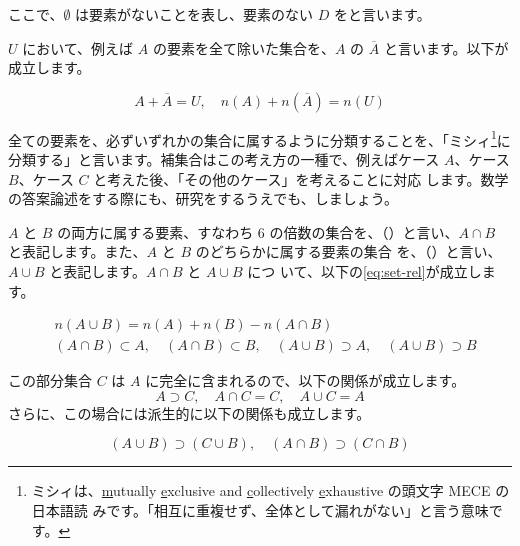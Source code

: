 ここで、$\emptyset$ は要素がないことを表し、要素のない $D$ をと言います。

$U$ において、例えば $A$ の要素を全て除いた集合を、$A$ の $\overline{A}$ と言います。以下が成立します。 

\begin{equation}
    A + \overline{A} = U,\quad n(A) + n(\overline{A}) = n(U) 
\end{equation}


全ての要素を、必ずいずれかの集合に属するように分類することを、「ミシ\nobreak ィ\footnote{ミシィは、\underline{m}utually \underline{e}xclusive and \underline{c}ollectively \underline{e}xhaustive の頭文字 MECE の日本語読 みです。「相互に重複せず、全体として漏れがない」と言う意味です。}に分類する」と言います。補集合はこの考え方の一種で、例えばケース $A$、ケース $B$、ケース $C$ と考えた後、「その他のケース」を考えることに対応 します。数学の答案論述をする際にも、研究をするうえでも、しましょう。 

$A$ と $B$ の両方に属する要素、すなわち 6 の倍数の集合を、（）と言い、$A \cap B$ と表記します。また、$A$ と $B$ のどちらかに属する要素の集合 を、（）と言い、$A \cup B$ と表記します。$A \cap B$ と $A \cup B$ につ いて、以下の\cref{eq:set-rel}が成立します。

\begin{equation}\label{eq:set-rel}
    \begin{split}
        &n(A \cup B) = n(A) + n(B) - n(A \cap B)\\
        &(A \cap B)\subset A,\quad(A \cap B)\subset B,\quad (A \cup B)\supset A,\quad (A \cup B)\supset B
    \end{split}
\end{equation}

この部分集合 $C$ は $A$ に完全に含まれるので、以下の関係が成立します。
\begin{equation}
    A \supset C,\quad A \cap C = C,\quad A \cup C = A
\end{equation}
さらに、この場合には派生的に以下の関係も成立します。

\begin{equation}
    (A \cup B) \supset (C \cup B),\quad (A \cap B) \supset (C \cap B)
\end{equation}

